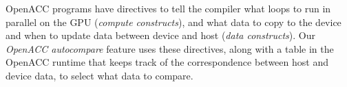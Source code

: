 OpenACC programs have directives to tell the compiler what loops to run in parallel on the GPU (\emph{compute constructs}), and what data to copy to the device and when to update data between device and host (\emph{data constructs}).
Our \emph{OpenACC autocompare} feature uses these directives, along with a table in the OpenACC runtime that keeps track of the correspondence between host and device data, to select what data to compare.
